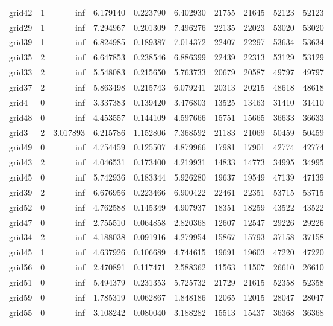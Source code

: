 \begin{longtable}{|l|r|r|r|r|r|r|r|r|r|}
grid42 & 1 & inf & 6.179140 & 0.223790 & 6.402930 & 21755 & 21645 & 52123 & 52123 \\
grid29 & 1 & inf & 7.294967 & 0.201309 & 7.496276 & 22135 & 22023 & 53020 & 53020 \\
grid39 & 1 & inf & 6.824985 & 0.189387 & 7.014372 & 22407 & 22297 & 53634 & 53634 \\
grid35 & 2 & inf & 6.647853 & 0.238546 & 6.886399 & 22439 & 22313 & 53129 & 53129 \\
grid33 & 2 & inf & 5.548083 & 0.215650 & 5.763733 & 20679 & 20587 & 49797 & 49797 \\
grid37 & 2 & inf & 5.863498 & 0.215743 & 6.079241 & 20313 & 20215 & 48618 & 48618 \\
grid4 & 0 & inf & 3.337383 & 0.139420 & 3.476803 & 13525 & 13463 & 31410 & 31410 \\
grid48 & 0 & inf & 4.453557 & 0.144109 & 4.597666 & 15751 & 15665 & 36633 & 36633 \\
grid3 & 2 & 3.017893 & 6.215786 & 1.152806 & 7.368592 & 21183 & 21069 & 50459 & 50459 \\
grid49 & 0 & inf & 4.754459 & 0.125507 & 4.879966 & 17981 & 17901 & 42774 & 42774 \\
grid43 & 2 & inf & 4.046531 & 0.173400 & 4.219931 & 14833 & 14773 & 34995 & 34995 \\
grid45 & 0 & inf & 5.742936 & 0.183344 & 5.926280 & 19637 & 19549 & 47139 & 47139 \\
grid39 & 2 & inf & 6.676956 & 0.223466 & 6.900422 & 22461 & 22351 & 53715 & 53715 \\
grid52 & 0 & inf & 4.762588 & 0.145349 & 4.907937 & 18351 & 18259 & 43522 & 43522 \\
grid47 & 0 & inf & 2.755510 & 0.064858 & 2.820368 & 12607 & 12547 & 29226 & 29226 \\
grid34 & 2 & inf & 4.188038 & 0.091916 & 4.279954 & 15867 & 15793 & 37158 & 37158 \\
grid45 & 1 & inf & 4.637926 & 0.106689 & 4.744615 & 19691 & 19603 & 47220 & 47220 \\
grid56 & 0 & inf & 2.470891 & 0.117471 & 2.588362 & 11563 & 11507 & 26610 & 26610 \\
grid51 & 0 & inf & 5.494379 & 0.231353 & 5.725732 & 21729 & 21615 & 52358 & 52358 \\
grid59 & 0 & inf & 1.785319 & 0.062867 & 1.848186 & 12065 & 12015 & 28047 & 28047 \\
grid55 & 0 & inf & 3.108242 & 0.080040 & 3.188282 & 15513 & 15437 & 36368 & 36368 \\

\end{longtable}
